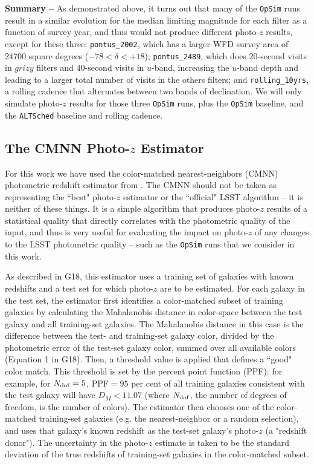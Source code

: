 {\bf Summary --} As demonstrated above, it turns out that many of the {\tt OpSim} runs result in a similar evolution for the median limiting magnitude for each filter as a function of survey year, and thus would not produce different photo-$z$ results, except for these three: {\tt pontus\_2002}, which has a larger WFD survey area of $24700$ square degrees ($-78 < \delta < +18$); {\tt pontus\_2489}, which does $20$-second visits in $grizy$ filters and $40$-second visits in $u$-band, increasing the $u$-band depth and leading to a larger total number of visits in the others filters; and {\tt rolling_10yrs}, a rolling cadence that alternates between two bands of declination. We will only simulate photo-$z$ results for those three {\tt OpSim} runs, plus the {\tt OpSim} baseline, and the {\tt ALTSched} baseline and rolling cadence.


\subsection{The CMNN Photo-$z$ Estimator}\label{ssec:pz_exp_cmnn}

For this work we have used the color-matched nearest-neighbors (CMNN) photometric redshift estimator from \cite[][herafter G18]{2018AJ....155....1G}. The CMNN should not be taken as representing the ``best" photo-$z$ estimator or the ``official" LSST algorithm -- it is neither of these things. It is a simple algorithm that produces photo-$z$ results of a statistical quality that directly correlates with the photometric quality of the input, and thus is very useful for evaluating the impact on photo-$z$ of any changes to the LSST photometric quality -- such as the {\tt OpSim} runs that we consider in this work.

As described in G18, this estimator uses a training set of galaxies with known redshifts and a test set for which photo-$z$ are to be estimated. For each galaxy in the test set, the estimator first identifies a color-matched subset of training galaxies by calculating the Mahalanobis distance in color-space between the test galaxy and all training-set galaxies. The Mahalanobis distance in this case is the difference between the test- and training-set galaxy color, divided by the photometric error of the test-set galaxy color, summed over all available colors (Equation 1 in G18). Then, a threshold value is applied that defines a ``good" color match. This threshold is set by the percent point function (PPF): for example, for $N_{\rm dof}=5$, PPF$=95$ per cent of all training galaxies consistent with the test galaxy will have $D_M < 11.07$ (where $N_{\rm dof}$, the number of degrees of freedom, is the number of colors). The estimator then chooses one of the color-matched training-set galaxies (e.g. the nearest-neighbor or a random selection), and uses that galaxy's known redshift as the test-set galaxy's photo-$z$ (a "redshift donor"). The uncertainty in the photo-$z$ estimate is taken to be the standard deviation of the true redshifts of training-set galaxies in the color-matched subset. 

